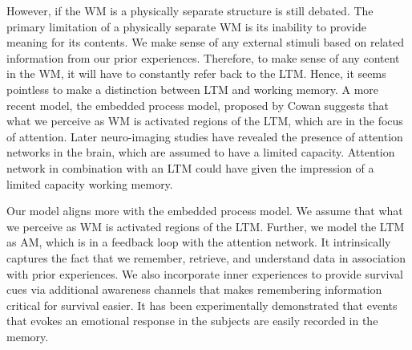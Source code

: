 \documentclass[reprint,amsmath,amssymb,apr,aip,onecolumn, 11pt]{revtex4-1}
\begin{document}
However, if the WM is a physically separate structure is still debated\cite{Raaijmakers_Shiffrin_2003}.
The primary limitation of a physically separate WM is its inability to provide meaning for its contents. We make sense of any external stimuli based on related information from our prior experiences. Therefore, to make sense of any content in the WM, it will have to constantly refer back to the LTM. Hence, it seems pointless to make a distinction between LTM and working memory. A more recent model, the embedded process model, proposed by Cowan\cite{Cowan1999,Cowan2021} suggests that what we perceive as WM is activated regions of the LTM, which are in the focus of attention. Later neuro-imaging studies have revealed the presence of attention networks in the brain, which are assumed to have a limited capacity. Attention network in combination with an LTM could have given the impression of a limited capacity working memory. 
 


Our model aligns more with the embedded process model. We assume that what we perceive as WM is activated regions of the LTM. Further, we model the LTM as AM, which is in a feedback loop with the attention network. It intrinsically captures the fact that we remember, retrieve, and understand data in association with prior experiences. We also incorporate inner experiences  to provide survival cues via additional awareness channels that makes remembering information critical for survival easier. It has been experimentally demonstrated that events that evokes an emotional response in the subjects are easily recorded in the memory\cite{LeDoux_2000,Phelps_2005}.

 
\end{document}
